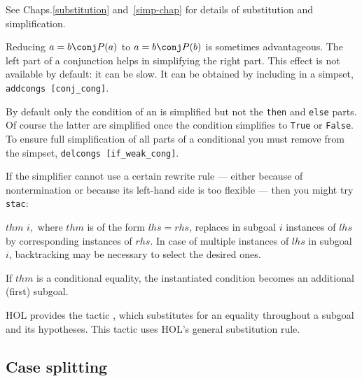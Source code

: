 See %
{Chaps.\ts\ref{substitution} and~\ref{simp-chap}} for details of substitution
and simplification.

\begin{warn}%
  Reducing $a=b\conj P(a)$ to $a=b\conj P(b)$ is sometimes advantageous.  The
  left part of a conjunction helps in simplifying the right part.  This effect
  is not available by default: it can be slow.  It can be obtained by
  including  in a simpset, \verb$addcongs [conj_cong]$.
\end{warn}

\begin{warn}\label{if-simp}%
  By default only the condition of an  is simplified but not the
  \texttt{then} and \texttt{else} parts. Of course the latter are simplified
  once the condition simplifies to \texttt{True} or \texttt{False}. To ensure
  full simplification of all parts of a conditional you must remove
   from the simpset, \verb$delcongs [if_weak_cong]$.
\end{warn}

If the simplifier cannot use a certain rewrite rule --- either because
of nontermination or because its left-hand side is too flexible ---
then you might try \texttt{stac}:
\begin{ttdescription}
\item[\ttindexbold{stac} $thm$ $i,$] where $thm$ is of the form $lhs = rhs$,
  replaces in subgoal $i$ instances of $lhs$ by corresponding instances of
  $rhs$.  In case of multiple instances of $lhs$ in subgoal $i$, backtracking
  may be necessary to select the desired ones.

If $thm$ is a conditional equality, the instantiated condition becomes an
additional (first) subgoal.
\end{ttdescription}

HOL provides the tactic , which substitutes for an
equality throughout a subgoal and its hypotheses.  This tactic uses HOL's
general substitution rule.

\subsection{Case splitting}
\label{subsec:HOL:case:splitting}

